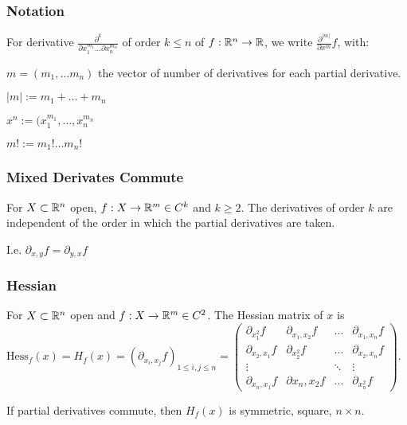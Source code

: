 \subsubsection{Notation}
For derivative $\frac{\partial^{k}}{\partial x_1^{m_1} \dots \partial x_n^{m_n}}$ of order $k \le n$ of $f: \mathbb{R}^n \to \mathbb{R}$, we write $\frac{\partial^{|m|}}{\partial x^{m}} f$, with:
\begin{inparaitem}
    \item $m = (m_1, \dots m_n)$ the vector of number of derivatives for each partial derivative.
    \item $|m| := m_1 + \dots + m_n$
    \item $x^n := (x_1^{m_1}, \dots , x_n^{m_n}$
    \item $m! := m_1! \dots m_n!$
\end{inparaitem}

\subsubsection{Mixed Derivates Commute}
For $X \subset \mathbb{R}^n$ open, $f: X \to \mathbb{R}^m \in C^k$ and $k \ge 2$. The derivatives of order $k$ are independent of the order in which the partial derivatives are taken.

\begin{compactitem}
    \item I.e. $\partial_{x, y} f = \partial_{y, x} f$
\end{compactitem}

\subsubsection{Hessian}
For $X \subset \mathbb{R}^n$ open and $f: X \to \mathbb{R}^m \in C^2$. The Hessian matrix of $x$ is $\text{Hess}_f(x) = H_f(x) = (\partial_{x_i, x_j}f)_{1 \le i, j \le n} =
\begin{pmatrix}
    \partial_{x_1^2} f & \partial_{x_1, x_2} f & \dots & \partial_{x_1, x_n} f\\
    \partial_{x_2, x_1} f & \partial_{x_2^2} f & \dots & \partial_{x_2, x_n} f\\
    \vdots & & \ddots & \vdots\\
    \partial_{x_n, x_1} f & \partial{x_n, x_2} f & \dots & \partial_{x_n^2} f
\end{pmatrix}$.

\begin{compactitem}
    \item If partial derivatives commute, then $H_f(x)$ is symmetric, square, $n \times n$.
\end{compactitem}

